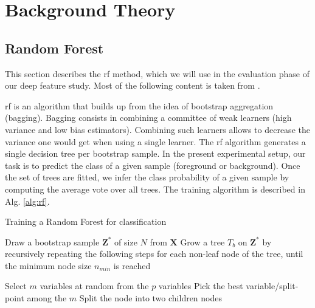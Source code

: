\section{Background Theory}

\subsection{Random Forest}
\label{sec:rf}
This section describes the \gls{rf} method, which we will use in the evaluation phase of our deep feature study.
Most of the following content is taken from \cite{hastie09}.

\gls{rf} is an algorithm that builds up from the idea of bootstrap aggregation (bagging).
Bagging consists in combining a committee of weak learners (high variance and low bias estimators).
Combining such learners allows to decrease the variance one would get when using a single learner.
The \gls{rf} algorithm generates a single decision tree per bootstrap sample.
In the present experimental setup, our task is to predict the class of a given sample (foreground or background).
Once the set of trees are fitted, we infer the class probability of a given sample by computing the average vote over all trees.
The training algorithm is described in Alg. \ref{alg:rf}.

\begin{algorithm}[H]
  \label{alg:rf}
 \caption{Training a Random Forest for classification}
 \begin{algorithmic}[1]
        \State Draw a bootstrap sample $\bm{Z}^{*}$ of size $N$ from $\bm{X}$
        \State Grow a tree $T_{b}$ on $\bm{Z}^{*}$ by recursively repeating the following steps for each non-leaf node of the tree, until the minimum node size $n_{min}$ is reached
        \begin{algsubstates}
                \State Select $m$ variables at random from the $p$ variables
                \State Pick the best variable/split-point among the $m$
                \State Split the node into two children nodes
            \end{algsubstates}
    \EndFor
  \end{algorithmic}
\end{algorithm}



